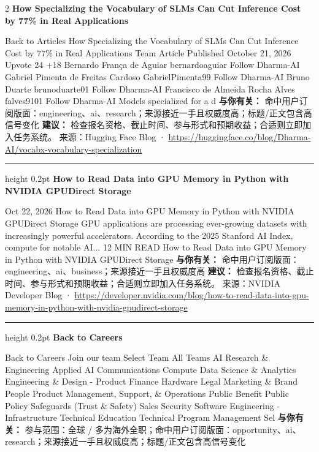 \documentclass[10.5pt]{ctexart}
\begin{document}
\begin{multicols}{2}
{\large\bfseries How Specializing the Vocabulary of SLMs Can Cut Inference Cost by 77\% in Real Applications}\par
Back to Articles How Specializing the Vocabulary of SLMs Can Cut Inference Cost by 77\% in Real Applications Team Article Published October 21, 2026 Upvote 24 +18 Bernardo França de Aguiar bernardoaguiar Follow Dharma-AI Gabriel Pimenta de Freitas Cardoso GabrielPimenta99 Follow Dharma-AI Bruno Duarte brunoduarte01 Follow Dharma-AI Francisco de Almeida Rocha Alves falves9101 Follow Dharma-AI Models specialized for a d
\textbf{与你有关：} 命中用户订阅版面：engineering、ai、research；来源接近一手且权威度高；标题/正文包含高信号变化
\textbf{建议：} 检查报名资格、截止时间、参与形式和预期收益；合适则立即加入任务系统。
{\footnotesize\color{ormuted} 来源：Hugging Face Blog · \url{https://huggingface.co/blog/Dharma-AI/vocabx-vocabulary-specialization}}
\vspace{2mm}
\hrule height 0.2pt
\vspace{2mm}
{\large\bfseries How to Read Data into GPU Memory in Python with NVIDIA GPUDirect Storage}\par
Oct 22, 2026 How to Read Data into GPU Memory in Python with NVIDIA GPUDirect Storage GPU applications are processing ever-growing datasets with increasingly powerful accelerators. According to the 2025 Stanford AI Index, compute for notable AI... 12 MIN READ How to Read Data into GPU Memory in Python with NVIDIA GPUDirect Storage
\textbf{与你有关：} 命中用户订阅版面：engineering、ai、business；来源接近一手且权威度高
\textbf{建议：} 检查报名资格、截止时间、参与形式和预期收益；合适则立即加入任务系统。
{\footnotesize\color{ormuted} 来源：NVIDIA Developer Blog · \url{https://developer.nvidia.com/blog/how-to-read-data-into-gpu-memory-in-python-with-nvidia-gpudirect-storage}}
\vspace{2mm}
\hrule height 0.2pt
\vspace{2mm}
{\large\bfseries Back to Careers}\par
Back to Careers Join our team Select Team All Teams AI Research \& Engineering Applied AI Communications Compute Data Science \& Analytics Engineering \& Design - Product Finance Hardware Legal Marketing \& Brand People Product Management, Support, \& Operations Public Benefit Public Policy Safeguards (Trust \& Safety) Sales Security Software Engineering - Infrastructure Technical Education Technical Program Management Sel
\textbf{与你有关：} 参与范围：全球 / 多为海外全职；命中用户订阅版面：opportunity、ai、research；来源接近一手且权威度高；标题/正文包含高信号变化

\end{multicols}
\end{document}
